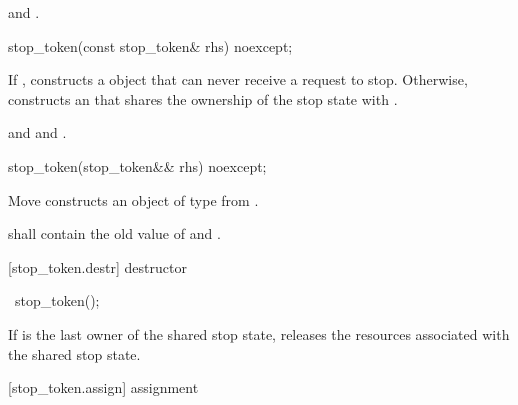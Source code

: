 {\begin{itemdescr}
  \pnum\postconditions {} and 
                       .
\end{itemdescr}


%
\begin{itemdecl}
stop_token(const stop_token& rhs) noexcept;
\end{itemdecl}
\begin{itemdescr}
  \pnum\effects If , constructs a  object
                that can never receive a request to stop.
                Otherwise, constructs an 
                that shares the ownership of the stop state with .

  \pnum\postconditions {}
                and 
                and .
\end{itemdescr}

%
\begin{itemdecl}
stop_token(stop_token&& rhs) noexcept;
\end{itemdecl}
\begin{itemdescr}
  \pnum\effects Move constructs an object of type  from .

  \pnum\postconditions {} shall contain the old value of  and
                        .
\end{itemdescr}

[stop_token.destr]{ destructor}

%
\begin{itemdecl}
~stop_token();
\end{itemdecl}

\begin{itemdescr}
 \pnum\effects If  is the last owner of the shared stop state,
                releases the resources associated with the shared stop state.
\end{itemdescr}

[stop_token.assign]{ assignment}

}
